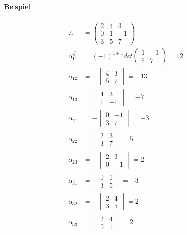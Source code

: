 \documentclass[11pt]{report}
\begin{document}
\paragraph{Beispiel}

\begin{align}
A &= \begin{pmatrix} 2 & 4 & 3 \\ 0 & 1 & -1 \\ 3 & 5 & 7 \end{pmatrix} \\
\alpha_{11}^{\#} &= (-1)^{1+1} det \begin{pmatrix} 1 & -1 \\ 5 & 7 \end{pmatrix} = 12 \\
\alpha_{12} &= -\begin{vmatrix} 4 & 3 \\ 5 & 7 \end{vmatrix} = -13 \\
\alpha_{13} &= \begin{vmatrix} 4 & 3 \\ 1 & -1 \end{vmatrix} = -7 \\
\alpha_{21} &= -\begin{vmatrix} 0 & -1 \\ 3 & 7 \end{vmatrix} = -3 \\
\alpha_{22} &= \begin{vmatrix} 2 & 3 \\ 3 & 7 \end{vmatrix} = 5 \\
\alpha_{23} &= -\begin{vmatrix} 2 & 3 \\ 0 & -1 \end{vmatrix} = 2 \\
\alpha_{31} &= \begin{vmatrix} 0 & 1 \\ 3 & 5 \end{vmatrix} = -3 \\
\alpha_{32} &= -\begin{vmatrix} 2 & 4 \\ 3 & 5 \end{vmatrix} = 2 \\
\alpha_{33} &= \begin{vmatrix} 2 & 4 \\ 0 & 1 \end{vmatrix} = 2 \\

\end{align}
\end{document}
